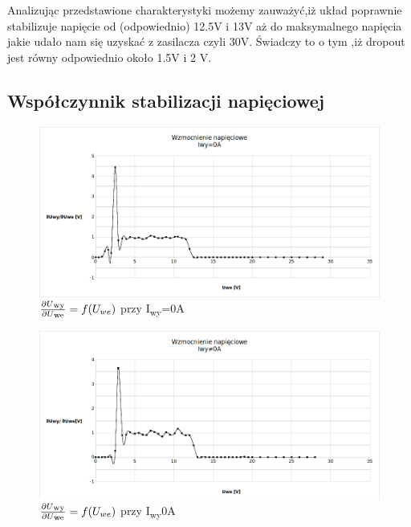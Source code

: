 \documentclass[a4paper,12pt]{article}
\begin{document}
Analizując przedstawione charakterystyki możemy zauważyć,iż układ poprawnie stabilizuje napięcie od (odpowiednio) 12.5V i 13V aż do maksymalnego
napięcia jakie udało nam się uzyskać z zasilacza czyli 30V. Świadczy to o tym ,iż dropout jest równy odpowiednio około 1.5V i 2 V.
\pagebreak
\subsection{Współczynnik stabilizacji napięciowej}
\begin{figure}[h!]
  \center 
  \includegraphics[width=1\textwidth]{wzmocnienie1}
  \caption{ $\frac{\partial U\textsubscript{wy}}{\partial U\textsubscript{we}}=f(U_{we})$ przy I\textsubscript{wy}=0A}
\end{figure}

\begin{figure}[h!]
  \center
  \includegraphics[width=1\textwidth]{wzmocnienie2}
  \caption{ $\frac{\partial U\textsubscript{wy}}{\partial U\textsubscript{we}}=f(U_{we})$ przy I\textsubscript{wy}\neq0A}
\end{figure}
\end{document}
